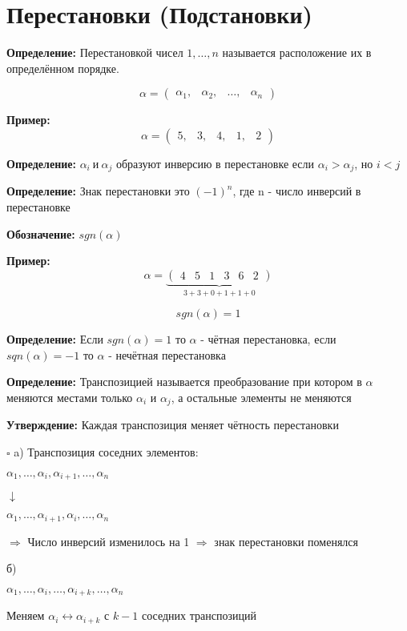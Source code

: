 \documentclass[a4paper,12pt]{article}
\begin{document}
	\section{Перестановки (Подстановки)}
	{\bf Определение: } Перестановкой чисел $1, \ldots, n$ называется расположение их в определённом порядке.

	\[
		\alpha =
		\begin{pmatrix}
			\alpha_1, & \alpha_2, & \ldots, & \alpha_n
		\end{pmatrix}
	\]

	{\bf Пример: } 
	\[
		\alpha =
		\begin{pmatrix}
			5, & 3, & 4, & 1, & 2
		\end{pmatrix}
	\]

	{\bf Определение: } $\alpha_i~\text{и}~\alpha_j$ образуют инверсию в перестановке если $\alpha_i > \alpha_j$, но $i < j$ 

	{\bf Определение: } Знак перестановки это $(-1)^n$, где n - число инверсий в перестановке

	{\bf Обозначение: } $sgn(\alpha)$


	{\bf Пример: }
	\[
		\alpha =
		\underbrace{
			\begin{pmatrix}
				4 & 5 & 1 & 3 & 6 & 2
			\end{pmatrix}
		}_{3+3+0+1+1+0}
	\]

	$$sgn(\alpha)=1$$

	{\bf Определение: } Если $sgn(\alpha)=1$ то $\alpha$ - чётная перестановка, если $sqn(\alpha)=-1$ то $\alpha$ - нечётная перестановка

	{\bf Определение: } Транспозицией называется преобразование при котором в $\alpha$ меняются местами только $\alpha_i$ и $\alpha_j$, а остальные элементы не меняются

	{\bf Утверждение: } Каждая транспозиция меняет чётность перестановки

	$\square$ a) Транспозиция соседних элементов:

	$\alpha_1, \ldots, \alpha_i, \alpha_{i+1}, \ldots, \alpha_n$

	$\downarrow$

	$\alpha_1, \ldots, \alpha_{i+1}, \alpha_i, \ldots, \alpha_n$

	$\Rightarrow$ Число инверсий изменилось на 1 $\Rightarrow$ знак перестановки поменялся

	б) 

	$\alpha_1, \ldots, \alpha_i, \ldots, \alpha_{i+k}, \ldots, \alpha_n$

	Меняем $\alpha_{i} \leftrightarrow \alpha_{i+k}$ с $k-1$ соседних транспозиций
\end{document}

